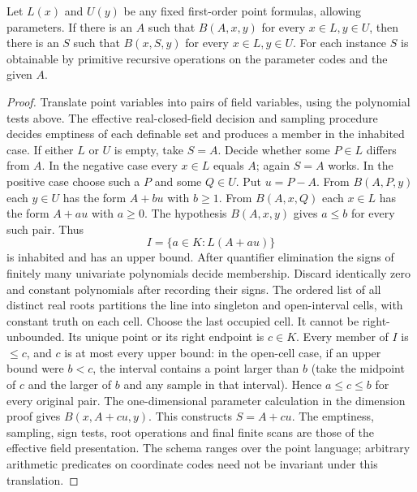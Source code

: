 \begin{theorem}
Let $L(x)$ and $U(y)$ be any fixed first-order point formulas, allowing
parameters. If there is an $A$ such that $B(A,x,y)$ for every
$x\in L,y\in U$, then there is an $S$ such that $B(x,S,y)$ for every
$x\in L,y\in U$. For each instance $S$ is obtainable by primitive
recursive operations on the parameter codes and the given $A$.
\end{theorem}
\begin{proof}
Translate point variables into pairs of field variables, using the
polynomial tests above. The effective real-closed-field decision and
sampling procedure decides emptiness of each definable set and produces
a member in the inhabited case. If either $L$ or $U$ is empty, take $S=A$.
Decide whether some $P\in L$ differs from $A$. In the negative case
every $x\in L$ equals $A$; again $S=A$ works. In the positive case
choose such a $P$ and some $Q\in U$. Put $u=P-A$. From $B(A,P,y)$
each $y\in U$ has the form $A+bu$ with $b\geq1$. From $B(A,x,Q)$
each $x\in L$ has the form $A+au$ with $a\geq0$. The hypothesis
$B(A,x,y)$ gives $a\leq b$ for every such pair. Thus
\[
             I=\{a\in K:L(A+au)\}
\]
is inhabited and has an upper bound. After quantifier elimination
the signs of finitely many univariate polynomials decide membership.
Discard identically zero and constant polynomials after recording
their signs. The ordered list of all distinct real roots partitions
the line into singleton and open-interval cells, with constant truth
on each cell. Choose the last occupied cell. It cannot be right-unbounded.
Its unique point or its right endpoint is $c\in K$.
Every member of $I$ is $\leq c$, and $c$ is at most every upper bound:
in the open-cell case, if an upper bound were $b<c$, the interval
contains a point larger than $b$ (take the midpoint of $c$ and the
larger of $b$ and any sample in that interval). Hence $a\leq c\leq b$
for every original pair. The one-dimensional parameter calculation in
the dimension proof gives $B(x,A+cu,y)$. This constructs $S=A+cu$.
The emptiness, sampling, sign tests, root operations and final
finite scans are those of the effective field presentation. The
schema ranges over the point language; arbitrary arithmetic predicates
on coordinate codes need not be invariant under this translation.
\end{proof}

